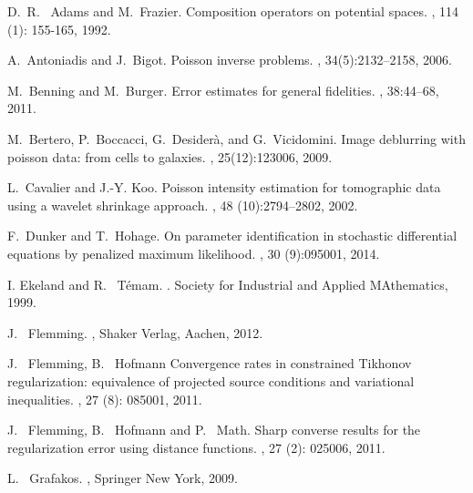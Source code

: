 \documentclass[10pt]{iopart}
\begin{document}
\begin{thebibliography}{10}

D.~R.~ Adams and M.~Frazier.
\newblock Composition operators on potential spaces.
, 114 (1): 155-165, 1992.

A.~Antoniadis and J.~Bigot.
\newblock Poisson inverse problems.
, 34(5):2132--2158, 2006.

M.~Benning and M.~Burger.
\newblock Error estimates for general fidelities.
, 38:44--68, 2011.

M.~Bertero, P.~Boccacci, G.~Desiderà, and G.~Vicidomini.
\newblock Image deblurring with poisson data: from cells to galaxies.
, 25(12):123006, 2009.


L.~Cavalier and J.-Y. Koo.
\newblock Poisson intensity estimation for tomographic data using a wavelet
  shrinkage approach.
, 48 (10):2794--2802, 2002.


F.~Dunker and T.~Hohage.
\newblock On parameter identification in stochastic differential equations by
  penalized maximum likelihood.
, 30 (9):095001, 2014.


I. Ekeland and R. ~T\'{e}mam. 
. 
Society for Industrial and Applied MAthematics, 1999.

J. ~Flemming.
, 
Shaker Verlag, Aachen, 2012.

J. ~Flemming, B. ~Hofmann
\newblock Convergence rates in constrained Tikhonov regularization: equivalence of projected source conditions and
variational inequalities.
, 27 (8): 085001, 2011.

J. ~Flemming, B. ~Hofmann and P. ~Math. 
\newblock Sharp converse results for the regularization error using distance functions.
, 27 (2): 025006, 2011.


L. ~Grafakos. 
, Springer New York, 2009.


\end{thebibliography}
\end{document}
